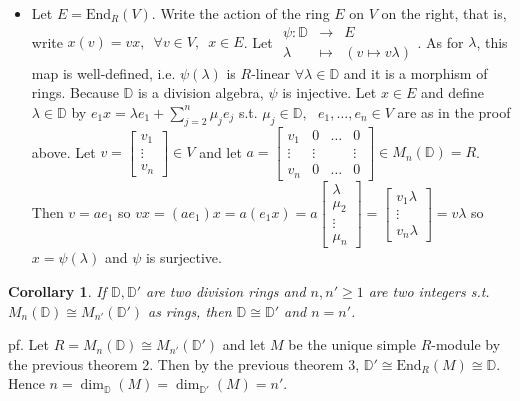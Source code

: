 \documentclass[12pt,letterpaper]{report}
\newtheorem{corollary}{Corollary}[section]
\begin{document}
\begin{itemize}
\item Let $E=\text{End}_{R}(V)$. Write the action of the ring $E$ on $V$ on the right, that is, write $x(v)=vx,\,\,\,\forall v\in V,\,\,\,x\in E$. Let $\begin{array}{rrr}\psi:\mathbb{D}&\rightarrow& E\\\lambda&\mapsto&(v\mapsto v\lambda)\end{array}$. As for $\lambda$, this map is well-defined, i.e. $\psi(\lambda)$ is $R$-linear $\forall \lambda\in\mathbb{D}$ and it is a morphism of rings. Because $\mathbb{D}$ is a division algebra, $\psi$ is injective. Let $x\in E$ and define $\lambda\in\mathbb{D}$ by $e_{1}x=\lambda e_{1}+\sum_{j=2}^{n}\mu_{j}e_{j}$ s.t. $\mu_{j}\in\mathbb{D},\,\,\,\,e_{1},\dots,e_{n}\in V$ are as in the proof above. Let $v=\begin{bmatrix}v_{1}\\\vdots\\v_{n}\end{bmatrix}\in V$ and let $a=\begin{bmatrix}v_{1}&0&\hdots&0\\\vdots&\vdots&&\vdots\\v_{n}&0&\hdots&0\end{bmatrix}\in M_{n}(\mathbb{D})=R$. Then $v=ae_{1}$ so $vx=(ae_{1})x=a(e_{1}x)=a\begin{bmatrix}\lambda\\\mu_{2}\\\vdots\\\mu_{n}\end{bmatrix}=\begin{bmatrix}v_{1}\lambda\\\vdots\\v_{n}\lambda\end{bmatrix}=v\lambda$ so $x=\psi(\lambda)$ and $\psi $ is surjective. 



\end{itemize}
\begin{corollary}If $\mathbb{D,D}'$ are two division rings and $n,n'\geq1$ are two integers s.t. $M_{n}(\mathbb{D})\cong M_{n'}(\mathbb{D}')$ as rings, then $\mathbb{D}\cong\mathbb{D}'$ and $n=n'$.\end{corollary}
pf. Let $R=M_{n}(\mathbb{D})\cong M_{n'}(\mathbb{D}')$ and let $M$ be the unique simple $R$-module by the previous theorem 2. Then by the previous theorem 3, $\mathbb{D}'\cong\text{End}_{R}(M)\cong\mathbb{D}$. Hence $n=\dim_{\mathbb{D}}(M)=\dim_{\mathbb{D}'}(M)=n'$. 
\end{document}
